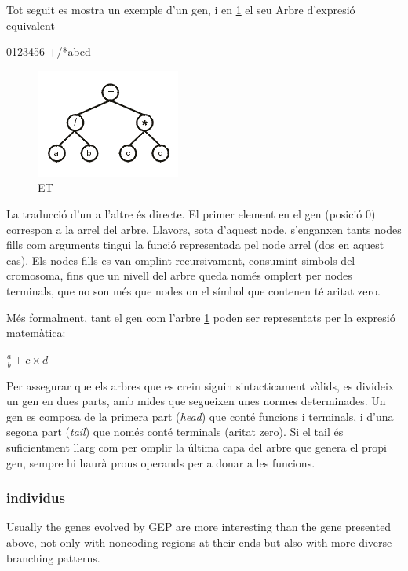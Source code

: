 \documentclass[titlepage,a4paper,12pt]{book}
\begin{document}
Tot seguit es mostra un exemple d'un gen, i en \ref{fig:expression tree1} el seu Arbre d'expresió equivalent

\begin{center}
0123456    
+/*abcd
\end{center}

\begin{figure}[h]
\begin{center}
\includegraphics{intro/et1.png}
\end{center}
\caption{ET}
\label{fig:expression tree1}
\end{figure}

La traducció d'un a l'altre és directe.  El primer element en el gen (posició
0) correspon a la arrel del arbre.  Llavors, sota d'aquest node, s'enganxen
tants nodes fills com arguments tingui la funció representada pel node arrel
(dos en aquest cas). Els nodes fills es van omplint recursivament, consumint
simbols del cromosoma, fins que un nivell del arbre queda només omplert per
nodes terminals, que no son més que nodes on el símbol que contenen té aritat
zero.

Més formalment, tant el gen com l'arbre \ref{fig:expression tree1} poden ser
representats per la expresió matemàtica:

	$\frac{a}{b}+c \times d$

Per assegurar que els arbres que es crein siguin sintacticament vàlids,
es divideix un gen en dues parts, amb mides que segueixen unes normes
determinades.  Un gen es composa de la primera part (\emph{head}) que conté
funcions i terminals, i d'una segona part (\emph{tail}) que només conté
terminals (aritat zero). Si el tail és suficientment llarg com per omplir la
última capa del arbre que genera el propi gen, sempre hi haurà prous operands
per a donar a les funcions.


\subsubsection{individus} %
\label{ssub:individus}
Usually the genes evolved by GEP are more interesting than the gene presented above, not only with noncoding regions at their ends but also with more diverse branching patterns.
\end{document}
